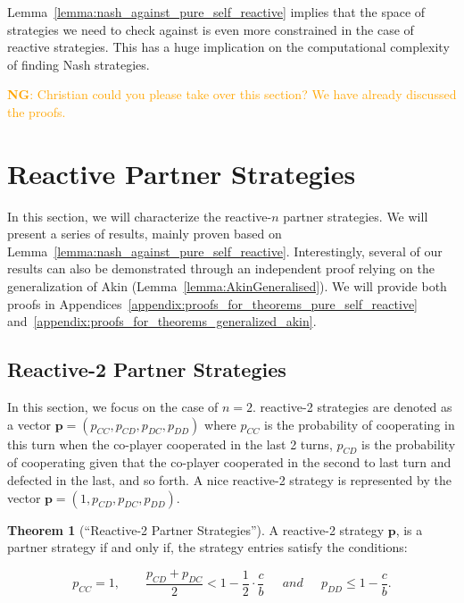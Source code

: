 \documentclass[11pt]{article}
\newcommand{\nikoleta}[1]{\textcolor{orange}{\textbf{NG}: #1}}
\theoremstyle{definition}
\newtheorem{theorem}{Theorem}[section]
\begin{document}
Lemma~\ref{lemma:nash_against_pure_self_reactive} implies that the space of
strategies we need to check against is even more constrained in the case of
reactive strategies. This has a huge implication on the computational complexity
of finding Nash strategies.

\nikoleta{Christian could you please take over this section? We have already
discussed the proofs.}


\section{Reactive Partner Strategies}\label{section:reactive_strategies}

In this section, we will characterize the reactive-$n$ partner strategies. We
will present a series of results, mainly proven based on
Lemma~\ref{lemma:nash_against_pure_self_reactive}. Interestingly, several of our
results can also be demonstrated through an independent proof relying on the
generalization of Akin (Lemma~\ref{lemma:AkinGeneralised}). We will provide both
proofs in Appendices~\ref{appendix:proofs_for_theorems_pure_self_reactive}
and~\ref{appendix:proofs_for_theorems_generalized_akin}.


\subsection{Reactive-2 Partner Strategies}\label{section:reactive_two_partner_strategies}

In this section, we focus on the case of $n=2$. reactive-2 strategies are denoted as a vector
$\mathbf{p}=(p_{CC}, p_{CD}, p_{DC}, p_{DD})$ where $p_{CC}$ is the
probability of cooperating in this turn when the co-player cooperated in the
last 2 turns, $p_{CD}$ is the probability of cooperating given that the
co-player cooperated in the second to last turn and defected in the last, and so
forth. A nice reactive-2 strategy is represented by the vector $\mathbf{p}=(1,
p_{CD}, p_{DC}, p_{DD})$.

\begin{theorem}[``Reactive-2 Partner Strategies'']\label{theorem:reactive_two_partner_strategies}
A reactive-2 strategy $\mathbf{p}$, is a partner strategy if and only if,
the strategy entries satisfy the conditions:

\begin{equation}\label{eq:two_bit_conditions}
  p_{CC} = 1, \qquad \displaystyle \frac{p_{CD} + p_{DC}}{2} < 1 - \frac{1}{2} \cdot \frac{c}{b} \quad ~~and~~ \quad \displaystyle p_{DD} \leq 1\!-\! \frac{c}{b}.
\end{equation}
\end{theorem}
\end{document}

